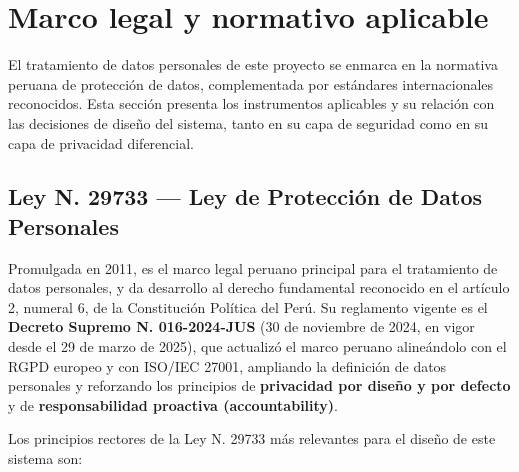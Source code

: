 \documentclass[11pt,a4paper]{article}
\begin{document}
\section{Marco legal y normativo aplicable}

El tratamiento de datos personales de este proyecto se enmarca en la normativa peruana de
protección de datos, complementada por estándares internacionales reconocidos. Esta sección
presenta los instrumentos aplicables y su relación con las decisiones de diseño del sistema,
tanto en su capa de seguridad como en su capa de privacidad diferencial.

\subsection{Ley N.\textdegree{} 29733 --- Ley de Protección de Datos Personales}

Promulgada en 2011, es el marco legal peruano principal para el tratamiento de datos personales,
y da desarrollo al derecho fundamental reconocido en el artículo 2, numeral 6, de la Constitución
Política del Perú. Su reglamento vigente es el \textbf{Decreto Supremo N.\textdegree{}
016-2024-JUS} (30 de noviembre de 2024, en vigor desde el 29 de marzo de 2025), que actualizó el
marco peruano alineándolo con el RGPD europeo y con ISO/IEC 27001, ampliando la definición de
datos personales y reforzando los principios de \textbf{privacidad por diseño y por defecto} y de
\textbf{responsabilidad proactiva (accountability)}.

Los principios rectores de la Ley N.\textdegree{} 29733 más relevantes para el diseño de este
sistema son:
\end{document}
